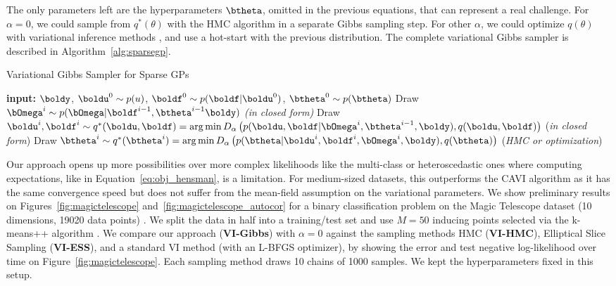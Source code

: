 The only parameters left are the hyperparameters $\btheta$, omitted in the previous equations, that can represent a real challenge.
For $\alpha=0$, we could sample from $q^*(\theta)$ with the \ac{HMC} algorithm in a separate Gibbs sampling step.
For other $\alpha$, we could optimize $q(\theta)$ with variational inference methods \cite{li2016renyi, hernandez2016black}, and use a hot-start with the previous distribution.
The complete variational Gibbs sampler is described in Algorithm~\ref{alg:sparsegp}.

\begin{algorithm}[H]
    \caption{Variational Gibbs Sampler for Sparse \ac{GPs}}
    \begin{algorithmic}
        \State \textbf{input:} $\boldy$, $\boldu^0 \sim p(u)$, $\boldf^0 \sim p(\boldf|\boldu^0)$, $\btheta^0 \sim p(\btheta)$
        \State Draw $\bOmega^i \sim p(\bOmega|\boldf^{i-1},\btheta^{i-1}\boldy)$ \textit{(in closed form)}
        \State Draw $\boldu^i,\boldf^i \sim q^*(\boldu,\boldf) = \arg \min D_\alpha\left(p(\boldu,\boldf|\bOmega^i,\btheta^{i-1},\boldy),q(\boldu,\boldf)\right)$ (\textit{in closed form})
        \State Draw $\btheta^i \sim q^*(\btheta^i) = \arg \min D_\alpha\left(p(\btheta|\boldu^i, \boldf^i, \bOmega^i, \boldy), q(\btheta)\right)$ (\textit{\ac{HMC} or optimization})
    \EndFor
    \end{algorithmic}
    \label{alg:sparsegp}
\end{algorithm}


Our approach opens up more possibilities over more complex likelihoods like the multi-class or heteroscedastic ones where computing expectations, like in Equation~\eqref{eq:obj_hensman}, is a limitation.
For medium-sized datasets, this outperforms the \ac{CAVI} algorithm as it has the same convergence speed but does not suffer from the mean-field assumption on the variational parameters.
We show preliminary results on Figures~\ref{fig:magictelescope} and~\ref{fig:magictelescope_autocor} for a binary classification problem on the Magic Telescope dataset (10 dimensions, 19020 data points) \cite{bock2004methods}.
We split the data in half into a training/test set and use $M=50$ inducing points selected via the k-means++ algorithm \cite{arthur2007k}.
We compare our approach (\textbf{VI-Gibbs}) with $\alpha=0$ against the sampling methods \ac{HMC} (\textbf{VI-HMC}), Elliptical Slice Sampling (\textbf{VI-ESS}),  and a standard \ac{VI} method (with an L-BFGS optimizer), by showing the error and test negative log-likelihood over time on Figure~\ref{fig:magictelescope}.
Each sampling method draws 10 chains of 1000 samples.
We kept the hyperparameters fixed in this setup.

